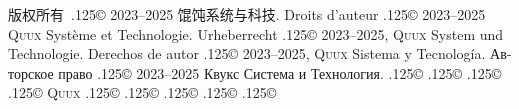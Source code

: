 \documentclass{cookbook}
\begin{document}
{{版权所有~{\lower.125\baselineskip\hbox{\copyright}}
	2023--2025 馄饨系统与科技.
Droits d'auteur {\lower.125\baselineskip\hbox{\copyright}} %
	2023--2025 \textsc{Quux} Système et Technologie.
Urheberrecht {\lower.125\baselineskip\hbox{\copyright}} %
	2023--2025, \textsc{Quux} System und Technologie.
Derechos de autor {\lower.125\baselineskip\hbox{\copyright}} %
	2023--2025, \textsc{Quux} Sistema y Tecnología.
\foreignlanguage{russian}{Авторское право} %
	{\lower.125\baselineskip\hbox{\copyright}}
	2023–2025 \foreignlanguage{russian}{Квукс Система и Технология.}
{\lower.125\baselineskip\hbox{\copyright}}
{\lower.125\baselineskip\hbox{\copyright}}
{\lower.125\baselineskip\hbox{\copyright}}
{\lower.125\baselineskip\hbox{\copyright}}
\textsc{Quux}
{\lower.125\baselineskip\hbox{\copyright}}
{\lower.125\baselineskip\hbox{\copyright}}
{\lower.125\baselineskip\hbox{\copyright}}
{\lower.125\baselineskip\hbox{\copyright}}
{\lower.125\baselineskip\hbox{\copyright}}
\vspace{-.5\textheight}%
}}%
\end{document}
